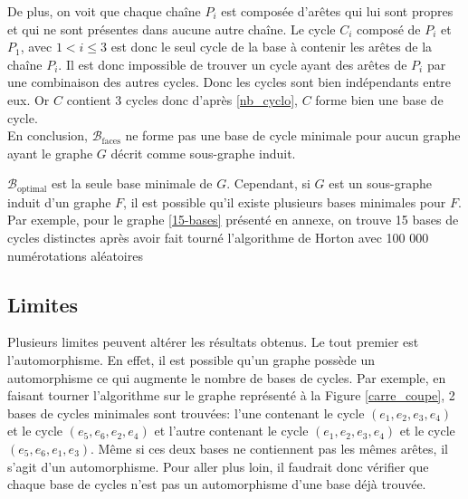\documentclass{article}
\begin{document}
De plus, on voit que chaque chaîne $P_i$ est composée d'arêtes qui lui sont propres et qui ne sont présentes dans aucune autre chaîne. Le cycle $C_i$ composé de $P_i$ et $P_1$, avec $1 < i \le 3 $ est donc le seul cycle de la base à contenir les arêtes de la chaîne $P_i$. Il est donc impossible de trouver un cycle ayant des arêtes de $P_i$ par une combinaison des autres cycles. Donc les cycles sont bien indépendants entre eux. Or $C$ contient 3 cycles donc d'après \ref{nb_cyclo}, $C$ forme bien une base de cycle. \\

En conclusion, $\mathcal{B}_{{\text{faces}}}$ ne forme pas une base de cycle minimale pour aucun graphe ayant le graphe $G$ décrit comme sous-graphe induit.

$\mathcal{B}_{{\text{optimal}}}$ est la seule base minimale de $G$. Cependant, si $G$ est un sous-graphe induit d'un graphe $F$, il est possible qu'il existe plusieurs bases minimales pour $F$. Par exemple, pour le graphe \ref{15-bases} présenté en annexe, on trouve 15 bases de cycles distinctes après avoir fait tourné l'algorithme de Horton avec 100 000 numérotations aléatoires

\subsection{Limites}

Plusieurs limites peuvent altérer les résultats obtenus. Le tout premier est l'automorphisme. En effet, il est possible qu'un graphe possède un automorphisme ce qui augmente le nombre de bases de cycles. Par exemple, en faisant tourner l'algorithme sur le graphe représenté à la Figure \ref{carre_coupe}, 2 bases de cycles minimales sont trouvées: l'une contenant le cycle $(e_1, e_2, e_3, e_4)$ et le cycle $(e_5, e_6, e_2, e_4)$ et l'autre contenant le cycle $(e_1, e_2, e_3, e_4)$ et le cycle $(e_5, e_6, e_1, e_3)$. Même si ces deux bases ne contiennent pas les mêmes arêtes, il s'agit d'un automorphisme. Pour aller plus loin, il faudrait donc vérifier que chaque base de cycles n'est pas un automorphisme d'une base déjà trouvée.
\end{document}
